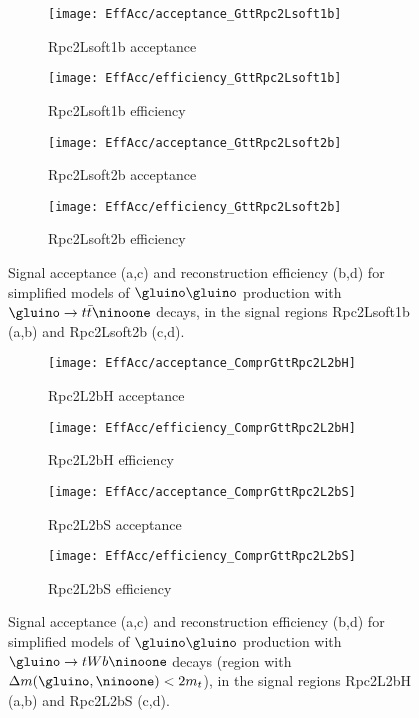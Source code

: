 \begin{figure}[htb!]
\centering
\begin{subfigure}[t]{0.49\textwidth}\texttt{[image: EffAcc/acceptance\_GttRpc2Lsoft1b]}\caption{Rpc2Lsoft1b acceptance}\end{subfigure}
\begin{subfigure}[t]{0.49\textwidth}\texttt{[image: EffAcc/efficiency\_GttRpc2Lsoft1b]}\caption{Rpc2Lsoft1b efficiency}\end{subfigure}
\begin{subfigure}[t]{0.49\textwidth}\texttt{[image: EffAcc/acceptance\_GttRpc2Lsoft2b]}\caption{Rpc2Lsoft2b acceptance}\end{subfigure}
\begin{subfigure}[t]{0.49\textwidth}\texttt{[image: EffAcc/efficiency\_GttRpc2Lsoft2b]}\caption{Rpc2Lsoft2b efficiency}\end{subfigure}
\caption{Signal acceptance (a,c) and reconstruction efficiency (b,d) 
for simplified models of $\gluino\gluino$ production with $\gluino\to t\bar t\ninoone$ decays, 
in the signal regions Rpc2Lsoft1b (a,b) and Rpc2Lsoft2b (c,d).}
\end{figure}

\begin{figure}[htb!]
\centering
\begin{subfigure}[t]{0.49\textwidth}\texttt{[image: EffAcc/acceptance\_ComprGttRpc2L2bH]}\caption{Rpc2L2bH acceptance}\end{subfigure}
\begin{subfigure}[t]{0.49\textwidth}\texttt{[image: EffAcc/efficiency\_ComprGttRpc2L2bH]}\caption{Rpc2L2bH efficiency}\end{subfigure}
\begin{subfigure}[t]{0.49\textwidth}\texttt{[image: EffAcc/acceptance\_ComprGttRpc2L2bS]}\caption{Rpc2L2bS acceptance}\end{subfigure}
\begin{subfigure}[t]{0.49\textwidth}\texttt{[image: EffAcc/efficiency\_ComprGttRpc2L2bS]}\caption{Rpc2L2bS efficiency}\end{subfigure}
\caption{Signal acceptance (a,c) and reconstruction efficiency (b,d) 
for simplified models of $\gluino\gluino$ production with $\gluino\to tWb\ninoone$ decays (region with $\Delta m(\gluino,\ninoone)<2m_t$), 
in the signal regions Rpc2L2bH (a,b) and Rpc2L2bS (c,d).}
\end{figure}

